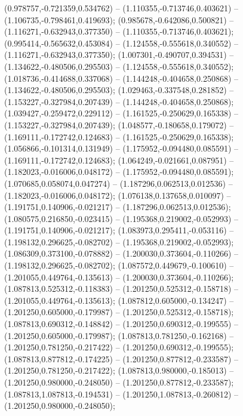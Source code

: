  (0.978757,-0.721359,0.534762) -- (1.110355,-0.713746,0.403621) -- (1.106735,-0.798461,0.419693);
 (0.985678,-0.642086,0.500821) -- (1.116271,-0.632943,0.377350) -- (1.110355,-0.713746,0.403621);
 (0.995414,-0.565632,0.453084) -- (1.124558,-0.555618,0.340552) -- (1.116271,-0.632943,0.377350);
 (1.007301,-0.490707,0.394531) -- (1.134622,-0.480506,0.295503) -- (1.124558,-0.555618,0.340552);
 (1.018736,-0.414688,0.337068) -- (1.144248,-0.404658,0.250868) -- (1.134622,-0.480506,0.295503);
 (1.029463,-0.337548,0.281852) -- (1.153227,-0.327984,0.207439) -- (1.144248,-0.404658,0.250868);
 (1.039427,-0.259472,0.229112) -- (1.161525,-0.250629,0.165338) -- (1.153227,-0.327984,0.207439);
 (1.048577,-0.180658,0.179072) -- (1.169111,-0.172742,0.124683) -- (1.161525,-0.250629,0.165338);
 (1.056866,-0.101314,0.131949) -- (1.175952,-0.094480,0.085591) -- (1.169111,-0.172742,0.124683);
 (1.064249,-0.021661,0.087951) -- (1.182023,-0.016006,0.048172) -- (1.175952,-0.094480,0.085591);
 (1.070685,0.058074,0.047274) -- (1.187296,0.062513,0.012536) -- (1.182023,-0.016006,0.048172);
 (1.076138,0.137658,0.010097) -- (1.191751,0.140906,-0.021217) -- (1.187296,0.062513,0.012536);
 (1.080575,0.216850,-0.023415) -- (1.195368,0.219002,-0.052993) -- (1.191751,0.140906,-0.021217);
 (1.083973,0.295411,-0.053116) -- (1.198132,0.296625,-0.082702) -- (1.195368,0.219002,-0.052993);
 (1.086309,0.373100,-0.078882) -- (1.200030,0.373604,-0.110266) -- (1.198132,0.296625,-0.082702);
 (1.087572,0.449679,-0.100610) -- (1.201055,0.449764,-0.135613) -- (1.200030,0.373604,-0.110266);
 (1.087813,0.525312,-0.118383) -- (1.201250,0.525312,-0.158718) -- (1.201055,0.449764,-0.135613);
 (1.087812,0.605000,-0.134247) -- (1.201250,0.605000,-0.179987) -- (1.201250,0.525312,-0.158718);
 (1.087813,0.690312,-0.148842) -- (1.201250,0.690312,-0.199555) -- (1.201250,0.605000,-0.179987);
 (1.087813,0.781250,-0.162168) -- (1.201250,0.781250,-0.217422) -- (1.201250,0.690312,-0.199555);
 (1.087813,0.877812,-0.174225) -- (1.201250,0.877812,-0.233587) -- (1.201250,0.781250,-0.217422);
 (1.087813,0.980000,-0.185013) -- (1.201250,0.980000,-0.248050) -- (1.201250,0.877812,-0.233587);
 (1.087813,1.087813,-0.194531) -- (1.201250,1.087813,-0.260812) -- (1.201250,0.980000,-0.248050);
